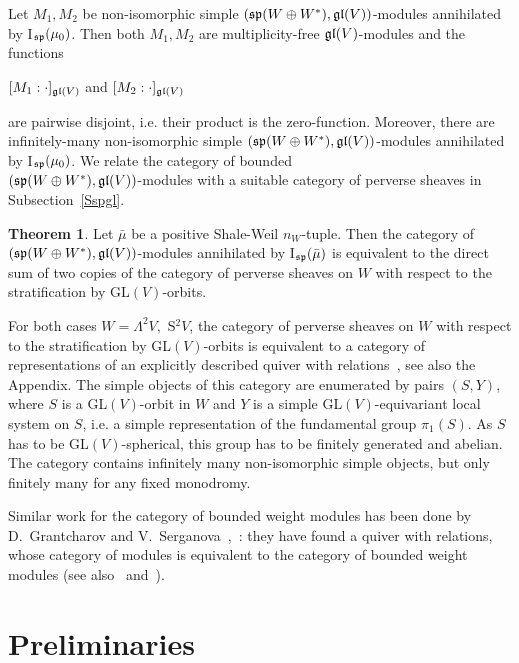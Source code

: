 \documentclass[12pt]{amsart}
\theoremstyle{definition}\newtheorem{theorem}{Theorem}[section]
\theoremstyle{definition}\newtheorem{definition}[proposition]{Definition}
\theoremstyle{remark}\newtheorem{example}[proposition]{Example}
\begin{document}
Let $M_1, M_2$ be non-isomorphic simple $(\frak{sp}(W\oplus W^*), \frak{gl}(V))$-modules annihilated by I$_\frak{sp}(\mu_0)$. Then both $M_1, M_2$ are multiplicity-free $\frak{gl}(V)$-modules and the functions \begin{center}$[M_1:\cdot]_{\frak{gl}(V)}$ and $[M_2:\cdot]_{\frak{gl}(V)}$\end{center} are pairwise disjoint, i.e. their product is the zero-function. Moreover, there are infinitely-many non-isomorphic simple $(\frak{sp}(W\oplus W^*), \frak{gl}(V))$-modules annihilated by I$_\frak{sp}(\mu_0)$. We relate the category of bounded \\$(\frak{sp}(W\oplus W^*), \frak{gl}(V))$-modules with a suitable category of perverse sheaves in Subsection~\ref{Sspgl}.
\begin{theorem}\label{Tspps} Let $\bar\mu$ be a positive Shale-Weil $n_W$-tuple. Then the category of $(\frak{sp}(W\oplus W^*), \frak{gl}(V))$-modules annihilated by I$_\frak{sp}(\bar\mu)$ is equivalent to the direct sum of two copies of the category of perverse sheaves on $W$ with respect to the stratification by GL$(V)$-orbits.\end{theorem}

For both cases $W=\Lambda^2V,$ S$^2V$, the category of perverse sheaves on $W$ with respect to the stratification by GL$(V)$-orbits is equivalent to a category of representations of an explicitly described quiver with relations~\cite{BG}, see also the Appendix. The simple objects of this category are enumerated by pairs $(S, Y)$, where $S$ is a GL$(V)$-orbit in $W$ and $Y$ is a simple GL$(V)$-equivariant local system on $S$, i.e. a simple representation of the fundamental group $\pi_1(S)$. As $S$ has to be GL$(V)$-spherical, this group has to be finitely generated and abelian. The category contains infinitely many non-isomorphic simple objects, but only finitely many for any fixed monodromy.

Similar work for the category of bounded weight modules has been done by D.~Grantcharov and V.~Serganova~\cite{GrS1},~\cite{GrS2}: they have found a quiver with relations, whose category of modules is equivalent to the category of bounded weight modules (see also~\cite{SM} and~\cite{GVM}).
\newpage\section{Preliminaries}\label{Spre}
\end{document}
